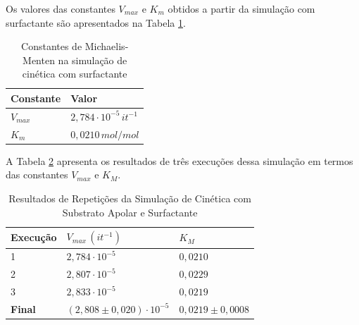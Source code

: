 \documentclass[12pt,oneside]{report}
\begin{document}
Os valores das constantes $V_{max}$ e $K_m$ obtidos a partir da simulação com surfactante são apresentados na Tabela \ref{tab:params_MM_surfactant_high}.

\begin{table}[H]
    \centering
    \caption{Constantes de Michaelis-Menten na simulação de cinética com surfactante}
    \vspace{0.2cm}
    \begin{tabularx}{\textwidth}{X m{5cm}}
        \hline
        \textbf{Constante} & \textbf{Valor}                     \\
        \hline
        $V_{max}$          & $2{,}784 \cdot 10^{-5} \, it^{-1}$ \\
        $K_m$              & $0{,}0210 \, mol/mol$              \\
        \hline
    \end{tabularx}
    \vspace{0.2cm}
    \label{tab:params_MM_surfactant_high}
\end{table}

A Tabela \ref{tab:surf_repeticoes_high} apresenta os resultados de três execuções dessa simulação em termos das constantes $V_{max}$ e $K_M$.

\begin{table}[H]
    \centering
    \caption{Resultados de Repetições da Simulação de Cinética com Substrato Apolar e Surfactante}
    \vspace{0.2cm}
    \begin{tabularx}{\textwidth}{X X m{5cm}}
        \hline
        \textbf{Execução} & \textbf{$V_{max} \, (it^{-1})$ }      & \textbf{$K_M$}          \\
        \hline
        1                 & $2{,}784 \cdot 10^{-5}$               & $0{,}0210$              \\
        2                 & $2{,}807 \cdot 10^{-5}$               & $0{,}0229$              \\
        3                 & $2{,}833 \cdot 10^{-5}$               & $0{,}0219$              \\
        \hline
        \textbf{Final}    & $(2{,}808 \pm 0{,}020) \cdot 10^{-5}$ & $0{,}0219 \pm 0{,}0008$ \\
        \hline
    \end{tabularx}
    \vspace{0.2cm}
    \label{tab:surf_repeticoes_high}
\end{table}
\end{document}
